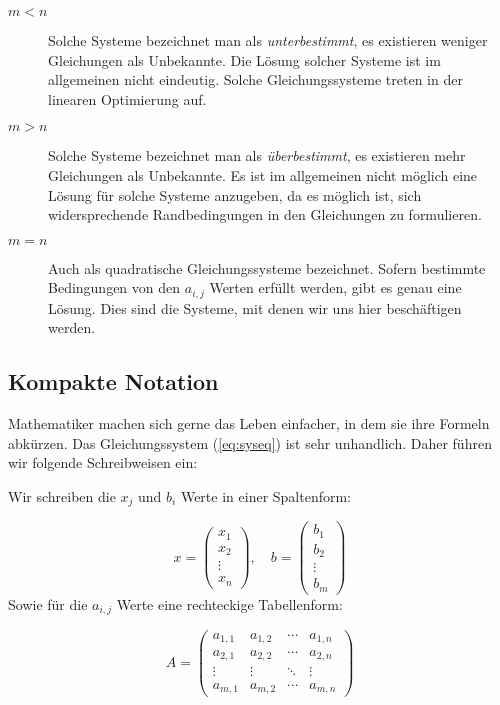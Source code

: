 \begin{description}
\item[$m<n$] Solche Systeme bezeichnet man als \textsl{unterbestimmt}, es existieren weniger Gleichungen als Unbekannte. Die Lösung solcher Systeme ist im allgemeinen nicht eindeutig. Solche Gleichungssysteme treten in der linearen Optimierung auf. 
\item[$m>n$] Solche Systeme bezeichnet man als \textsl{überbestimmt}, es existieren mehr Gleichungen als Unbekannte. Es ist im allgemeinen nicht möglich eine Lösung für solche Systeme anzugeben, da es möglich ist, sich widersprechende Randbedingungen in den Gleichungen zu formulieren. 
\item[$m=n$] Auch als quadratische Gleichungssysteme bezeichnet. Sofern bestimmte Bedingungen von den $a_{i,j}$ Werten erfüllt werden, gibt es genau eine Lösung. Dies sind die Systeme, mit denen wir uns hier beschäftigen werden.
\end{description}

\subsection{Kompakte Notation}

Mathematiker machen sich gerne das Leben einfacher, in dem sie ihre Formeln abkürzen. Das Gleichungssystem (\ref{eq:syseq}) ist sehr unhandlich. Daher führen wir folgende Schreibweisen ein:

Wir schreiben die $x_j$ und $b_i$ Werte in einer Spaltenform: 

\[
x = \begin{pmatrix}
x_1 \\
x_2 \\
\vdots \\
x_n
\end{pmatrix}, \quad b = \begin{pmatrix}
b_1 \\
b_2 \\
\vdots \\
b_m
\end{pmatrix}
\]
Sowie für die $a_{i,j}$ Werte eine rechteckige Tabellenform:

\[
A = \begin{pmatrix}
a_{1,1} & a_{1,2} & \cdots & a_{1,n} \\
a_{2,1} & a_{2,2} & \cdots & a_{2,n} \\
\vdots & \vdots & \ddots & \vdots \\
a_{m,1} & a_{m,2} & \cdots & a_{m,n}
\end{pmatrix}
\]

